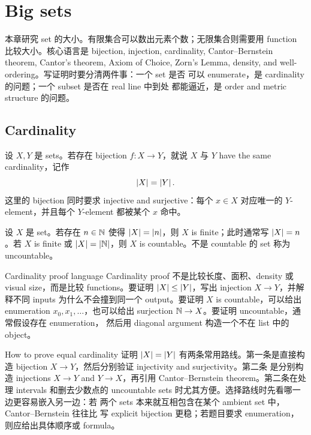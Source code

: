 \chapter{Big sets}

本章研究 set 的大小。有限集合可以数出元素个数；无限集合则需要用
function 比较大小。核心语言是 bijection, injection, cardinality,
Cantor--Bernstein theorem, Cantor's theorem, Axiom of Choice, Zorn's
Lemma, density, and well-ordering。写证明时要分清两件事：一个 set 是否
可以 enumerate，是 cardinality 的问题；一个 subset 是否在 real line 中到处
都能逼近，是 order and metric structure 的问题。

\section{Cardinality}

\begin{definition}
设 \(X,Y\) 是 sets。若存在 bijection \(f:X\to Y\)，就说 \(X\) 与
\(Y\) have the same cardinality，记作
\[
  \left|X\right|=\left|Y\right|.
\]
这里的 bijection 同时要求 injective and surjective：每个 \(x\in X\)
对应唯一的 \(Y\)-element，并且每个 \(Y\)-element 都被某个 \(x\) 命中。
\end{definition}

\begin{definition}
设 \(X\) 是 set。若存在 \(n\in\mathbb{N}\) 使得 \(\left|X\right|=\left|n\right|\)，则
\(X\) is finite；此时通常写 \(\left|X\right|=n\)。若 \(X\) is finite 或
\(\left|X\right|=\left|\mathbb{N}\right|\)，则 \(X\) is countable。不是 countable 的 set
称为 uncountable。
\end{definition}

\begin{reviewbox}{Cardinality proof language}
Cardinality proof 不是比较长度、面积、density 或 visual size，而是比较
functions。要证明 \(\left|X\right|\leq\left|Y\right|\)，写出 injection
\(X\to Y\)，并解释不同 inputs 为什么不会撞到同一个 output。要证明
\(X\) is countable，可以给出 enumeration \(x_0,x_1,\ldots\)，也可以给出
surjection \(\mathbb{N}\to X\)。要证明 uncountable，通常假设存在 enumeration，
然后用 diagonal argument 构造一个不在 list 中的 object。
\end{reviewbox}

\begin{reviewbox}{How to prove equal cardinality}
证明 \(\left|X\right|=\left|Y\right|\) 有两条常用路线。第一条是直接构造
bijection \(X\to Y\)，然后分别验证 injectivity and surjectivity。第二条
是分别构造 injections \(X\to Y\) and \(Y\to X\)，再引用
Cantor--Bernstein theorem。第二条在处理 intervals 和删去少数点的
uncountable sets 时尤其方便。选择路线时先看哪一边更容易嵌入另一边：若
两个 sets 本来就互相包含在某个 ambient set 中，Cantor--Bernstein 往往比
写 explicit bijection 更稳；若题目要求 enumeration，则应给出具体顺序或
formula。
\end{reviewbox}

